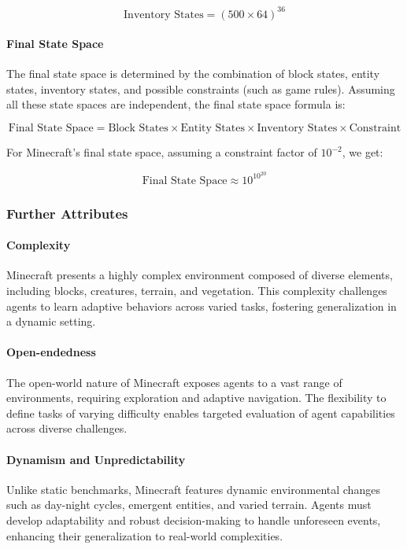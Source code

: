 \[
\text{Inventory States} = (500 \times 64)^{36}
\]



\paragraph{Final State Space}

The final state space is determined by the combination of block states, entity states, inventory states, and possible constraints (such as game rules). Assuming all these state spaces are independent, the final state space formula is:

\[
\text{Final State Space} = \text{Block States} \times \text{Entity States} \times \text{Inventory States} \times \text{Constraint}
\]

For Minecraft's final state space, assuming a constraint factor of \( 10^{-2} \), we get:

\[
\text{Final State Space} \approx 10^{10^{20}}
\]






\subsubsection{Further Attributes}


\paragraph{Complexity}
Minecraft presents a highly complex environment composed of diverse elements, including blocks, creatures, terrain, and vegetation. This complexity challenges agents to learn adaptive behaviors across varied tasks, fostering generalization in a dynamic setting.

\paragraph{Open-endedness}
The open-world nature of Minecraft exposes agents to a vast range of environments, requiring exploration and adaptive navigation. The flexibility to define tasks of varying difficulty enables targeted evaluation of agent capabilities across diverse challenges.

\paragraph{Dynamism and Unpredictability}
Unlike static benchmarks, Minecraft features dynamic environmental changes such as day-night cycles, emergent entities, and varied terrain. Agents must develop adaptability and robust decision-making to handle unforeseen events, enhancing their generalization to real-world complexities.


